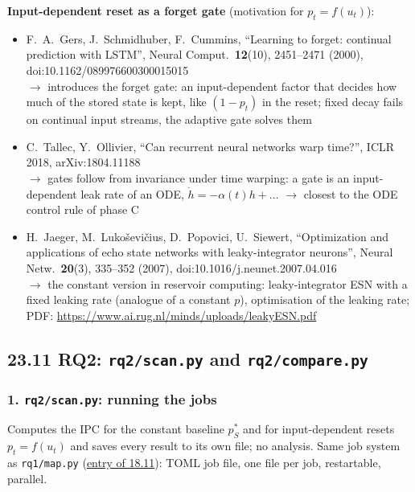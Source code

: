 \textbf{Input-dependent reset as a forget gate} (motivation for $p_t = f(u_t)$):
\begin{itemize}
    \item F.~A.~Gers, J.~Schmidhuber, F.~Cummins, ``Learning to forget: continual prediction with LSTM'', Neural
    Comput.\ \textbf{12}(10), 2451--2471 (2000), doi:10.1162/089976600300015015\\
    $\to$ introduces the forget gate: an input-dependent factor that decides how much of the stored state is kept,
    like $(1 - p_t)$ in the reset; fixed decay fails on continual input streams, the adaptive gate solves them
    \item C.~Tallec, Y.~Ollivier, ``Can recurrent neural networks warp time?'', ICLR 2018, arXiv:1804.11188\\
    $\to$ gates follow from invariance under time warping: a gate is an input-dependent leak rate of an ODE,
    $\dot h = -\alpha(t) h + \ldots$ $\to$ closest to the ODE control rule of phase C
    \item H.~Jaeger, M.~Luko\v{s}evi\v{c}ius, D.~Popovici, U.~Siewert, ``Optimization and applications of echo state
    networks with leaky-integrator neurons'', Neural Netw.\ \textbf{20}(3), 335--352 (2007),
    doi:10.1016/j.neunet.2007.04.016\\
    $\to$ the constant version in reservoir computing: leaky-integrator ESN with a fixed leaking rate (analogue of
    a constant $p$), optimisation of the leaking rate; PDF: \url{https://www.ai.rug.nl/minds/uploads/leakyESN.pdf}
\end{itemize}

\subsection*{23.11 \quad RQ2: \texttt{rq2/scan.py} and \texttt{rq2/compare.py}}
\label{sec:rq2-scan-compare}

\subsubsection*{1. \texttt{rq2/scan.py}: running the jobs}
Computes the IPC for the constant baseline $p^*_S$ and for input-dependent resets $p_t = f(u_t)$ and saves every
result to its own file; no analysis. Same job system as \texttt{rq1/map.py} (\hyperref[sec:job-system]{entry of
18.11}): TOML job file, one file per job, restartable, parallel.


